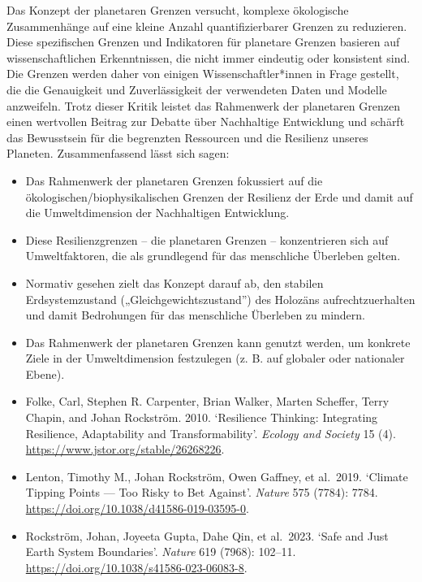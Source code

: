 \documentclass[
  nswissgerman,
  a4paper,
  openany]{book}
\begin{document}
Das Konzept der planetaren Grenzen versucht, komplexe ökologische
Zusammenhänge auf eine kleine Anzahl quantifizierbarer Grenzen zu
reduzieren. Diese spezifischen Grenzen und Indikatoren für planetare
Grenzen basieren auf wissenschaftlichen Erkenntnissen, die nicht immer
eindeutig oder konsistent sind. Die Grenzen werden daher von einigen
Wissenschaftler*innen in Frage gestellt, die die Genauigkeit und
Zuverlässigkeit der verwendeten Daten und Modelle anzweifeln. Trotz
dieser Kritik leistet das Rahmenwerk der planetaren Grenzen einen
wertvollen Beitrag zur Debatte über Nachhaltige Entwicklung und schärft
das Bewusstsein für die begrenzten Ressourcen und die Resilienz unseres
Planeten. Zusammenfassend lässt sich sagen:

\begin{itemize}
\item
  Das Rahmenwerk der planetaren Grenzen fokussiert auf die
  ökologischen/biophysikalischen Grenzen der Resilienz der Erde und
  damit auf die Umweltdimension der Nachhaltigen Entwicklung.
\item
  Diese Resilienzgrenzen -- die planetaren Grenzen -- konzentrieren sich
  auf Umweltfaktoren, die als grundlegend für das menschliche Überleben
  gelten.
\item
  Normativ gesehen zielt das Konzept darauf ab, den stabilen
  Erdsystemzustand („Gleichgewichtszustand'') des Holozäns
  aufrechtzuerhalten und damit Bedrohungen für das menschliche Überleben
  zu mindern.
\item
  Das Rahmenwerk der planetaren Grenzen kann genutzt werden, um konkrete
  Ziele in der Umweltdimension festzulegen (z. B. auf globaler oder
  nationaler Ebene).
\end{itemize}

\begin{tcolorbox}[enhanced jigsaw, arc=.35mm, bottomrule=.15mm, bottomtitle=1mm, breakable, colback=white, colbacktitle=quarto-callout-caution-color!10!white, colframe=quarto-callout-caution-color-frame, coltitle=black, left=2mm, leftrule=.75mm, opacityback=0, opacitybacktitle=0.6, rightrule=.15mm, title={Weiterführende Literatur}, titlerule=0mm, toprule=.15mm, toptitle=1mm]

\begin{itemize}
\item
  Folke, Carl, Stephen R. Carpenter, Brian Walker, Marten Scheffer,
  Terry Chapin, and Johan Rockström. 2010. `Resilience Thinking:
  Integrating Resilience, Adaptability and Transformability'.
  \emph{Ecology and Society} 15 (4).
  \url{https://www.jstor.org/stable/26268226}.
\item
  Lenton, Timothy M., Johan Rockström, Owen Gaffney, et al.~2019.
  `Climate Tipping Points --- Too Risky to Bet Against'. \emph{Nature}
  575 (7784): 7784. \url{https://doi.org/10.1038/d41586-019-03595-0}.
\item
  Rockström, Johan, Joyeeta Gupta, Dahe Qin, et al.~2023. `Safe and Just
  Earth System Boundaries'. \emph{Nature} 619 (7968): 102--11.
  \url{https://doi.org/10.1038/s41586-023-06083-8}.
\end{itemize}

\end{tcolorbox}
\end{document}
